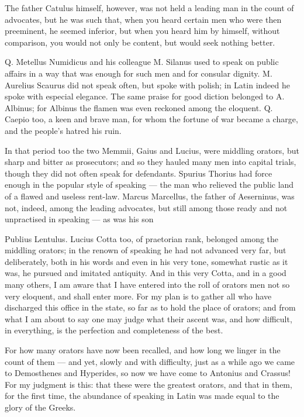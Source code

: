  The father Catulus himself, however, was not held a leading man in the count of advocates, but he was such that, when you heard certain men who were then preeminent, he seemed inferior, but when you heard him by himself, without comparison, you would not only be content, but would seek nothing better.

 Q. Metellus Numidicus and his colleague M. Silanus used to speak on public affairs in a way that was enough for such men and for consular dignity. M. Aurelius Scaurus did not speak often, but spoke with polish; in Latin indeed he spoke with especial elegance. The same praise for good diction belonged to A. Albinus; for Albinus the flamen was even reckoned among the eloquent. Q. Caepio too, a keen and brave man, for whom the fortune of war became a charge, and the people's hatred his ruin.

 In that period too the two Memmii, Gaius and Lucius, were middling orators, but sharp and bitter as prosecutors; and so they hauled many men into capital trials, though they did not often speak for defendants. Spurius Thorius had force enough in the popular style of speaking — the man who relieved the public land of a flawed and useless rent-law. Marcus Marcellus, the father of Aeserninus, was not, indeed, among the leading advocates, but still among those ready and not unpractised in speaking — as was his son

 Publius Lentulus. Lucius Cotta too, of praetorian rank, belonged among the middling orators; in the renown of speaking he had not advanced very far, but deliberately, both in his words and even in his very tone, somewhat rustic as it was, he pursued and imitated antiquity. And in this very Cotta, and in a good many others, I am aware that I have entered into the roll of orators men not so very eloquent, and shall enter more. For my plan is to gather all who have discharged this office in the state, so far as to hold the place of orators; and from what I am about to say one may judge what their ascent was, and how difficult, in everything, is the perfection and completeness of the best.

 For how many orators have now been recalled, and how long we linger in the count of them — and yet, slowly and with difficulty, just as a while ago we came to Demosthenes and Hyperides, so now we have come to Antonius and Crassus! For my judgment is this: that these were the greatest orators, and that in them, for the first time, the abundance of speaking in Latin was made equal to the glory of the Greeks.


